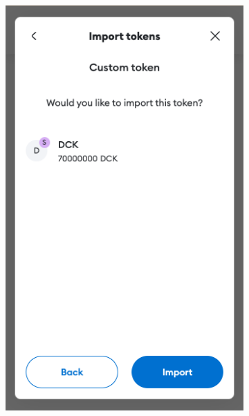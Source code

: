 \begin{figure}[ht!]
\begin{subfigure}{0.25\textwidth}
             \includegraphics[width=\textwidth]{IMAGES/metamask03.png}
            \label{fig_vsc}
        \end{subfigure}
        \hfill
        \begin{subfigure}{0.25\textwidth}

\end{subfigure}
\end{figure}

